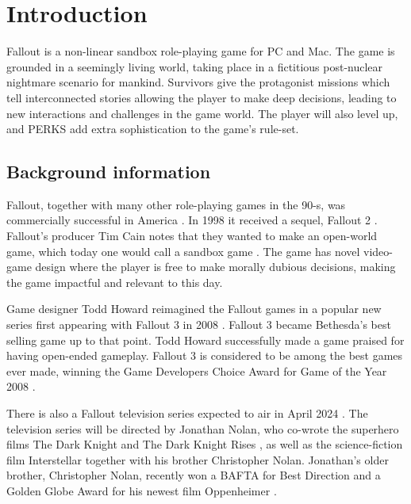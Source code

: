 
\section{Introduction}

Fallout \autocite{game:fallout1997} is a non-linear sandbox role-playing game for PC and Mac. The game is grounded in a seemingly living world, taking place in a fictitious post-nuclear nightmare scenario for mankind. Survivors give the protagonist missions which tell interconnected stories allowing the player to make deep decisions, leading to new interactions and challenges in the game world. The player will also level up, and PERKS add extra sophistication to the game's rule-set. 

\subsection{Background information}

Fallout, together with many other role-playing games in the 90-s, was commercially successful in America \autocite{sales}. In 1998 it received a sequel, Fallout 2 \autocite{fallout2}. Fallout's producer Tim Cain notes that they wanted to make an open-world game, which today one would call a sandbox game \autocite{cain}. The game has novel video-game design where the player is free to make morally dubious decisions, making the game impactful and relevant to this day.

Game designer Todd Howard reimagined the Fallout games in a popular new series first appearing with Fallout 3 in 2008 \autocite{fallout3}. Fallout 3 became Bethesda's best selling game up to that point. Todd Howard successfully made a game praised for having open-ended gameplay. Fallout 3 is considered to be among the best games ever made, winning the Game Developers Choice Award for Game of the Year 2008 \autocite{award}.

There is also a Fallout television series expected to air in April 2024 \autocite{tvseries}. The television series will be directed by Jonathan Nolan, who co-wrote the superhero films The Dark Knight \autocite{darknight} and The Dark Knight Rises \autocite{darknightrises}, as well as the science-fiction film Interstellar \autocite{interstellar} together with his brother Christopher Nolan. Jonathan's older brother, Christopher Nolan, recently won a BAFTA for Best Direction and a Golden Globe Award for his newest film Oppenheimer \autocite{oppenheimer}. %

